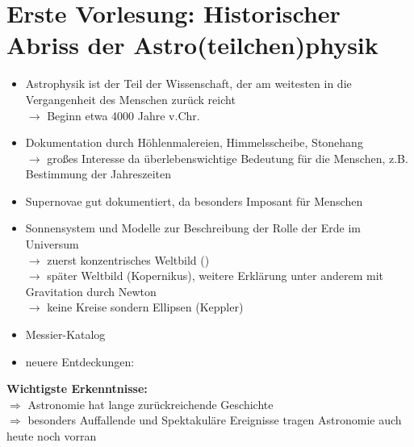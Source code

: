 \section{Erste Vorlesung: Historischer Abriss der Astro(teilchen)physik}
\begin{itemize}
\item Astrophysik ist der Teil der Wissenschaft, der am weitesten in die Vergangenheit des Menschen zurück reicht\\
      $\longrightarrow$ Beginn etwa 4000 Jahre v.Chr.
\item  Dokumentation durch Höhlenmalereien, Himmelsscheibe, Stonehang\\
      $\longrightarrow$ großes Interesse da überlebenswichtige Bedeutung für die Menschen, z.B. Bestimmung der Jahreszeiten
\item Supernovae gut dokumentiert, da besonders Imposant für Menschen
\item Sonnensystem und Modelle zur Beschreibung der Rolle der Erde im Universum\\
  	 $\longrightarrow$ zuerst konzentrisches Weltbild ()\\
     $\longrightarrow$ später Weltbild (Kopernikus), weitere Erklärung unter anderem mit Gravitation durch Newton\\
     $\longrightarrow$ keine Kreise sondern Ellipsen (Keppler)
\item Messier-Katalog
\item neuere Entdeckungen:

\end{itemize}

\textbf{Wichtigste Erkenntnisse:}\\
$\Longrightarrow$ Astronomie hat lange zurückreichende Geschichte\\
$\Longrightarrow$ besonders Auffallende und Spektakuläre Ereignisse tragen Astronomie auch heute noch vorran


